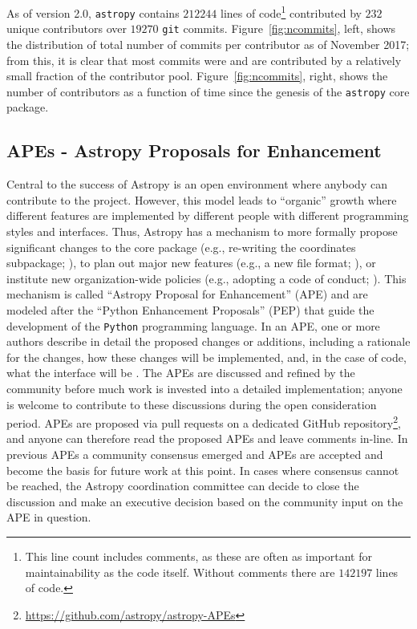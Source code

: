 \documentclass[modern]{aastex61}
\newcommand{\package}[1]{\texttt{#1}\xspace}
\newcommand{\python}{\package{Python}}
\newcommand{\astropy}{Astropy\xspace}
\newcommand{\astropypkg}{\package{astropy}}
\renewcommand{\figurename}{Figure\xspace}
\begin{document}
As of version 2.0, \astropypkg contains $212244$ lines of code\footnote{This
line count includes comments, as these are often as important for
maintainability as the code itself.  Without comments there are $142197$ lines
of code.} contributed by $232$ unique contributors over $19270$ \texttt{git}
commits.
\figurename~\ref{fig:ncommits}, left, shows the distribution of total number of
commits per contributor as of November 2017; from this, it is clear that most
commits were and are contributed by a relatively small fraction of the
contributor pool.
\figurename~\ref{fig:ncommits}, right, shows the number of contributors as a
function of time since the genesis of the \astropypkg core package.

\subsection{APEs - Astropy Proposals for Enhancement}

Central to the success of \astropy is an open environment where anybody can
contribute to the project.
However, this model leads to ``organic'' growth where different features are
implemented by different people with different programming styles and
interfaces.
Thus, \astropy has a mechanism to more formally propose significant changes to
the core package (e.g., re-writing the coordinates subpackage; \citealt{ape5}),
to plan out major new features (e.g., a new file format; \citealt{ape6}), or
institute new organization-wide policies (e.g., adopting a code of conduct;
\citealt{ape8}).
This mechanism is called ``Astropy Proposal for Enhancement'' (APE) and are
modeled after the ``Python Enhancement Proposals'' (PEP) that guide the
development of the \python programming language.
In an APE, one or more authors describe in detail the proposed changes or
additions, including a rationale for the changes, how these changes will be
implemented, and, in the case of code, what the interface will be \citep{ape1}.
The APEs are discussed and refined by the community before much work is invested
into a detailed implementation; anyone is welcome to contribute to these
discussions during the open consideration period. APEs are proposed via pull
requests on a dedicated GitHub repository\footnote{\url{https://github.com/astropy/astropy-APEs}},
and anyone can therefore read the proposed APEs and leave comments in-line.
In previous APEs a community consensus emerged and APEs are accepted and become
the basis for future work at this point.
In cases where consensus cannot be reached, the
\astropy coordination committee can decide to close the discussion and
make an executive decision based on the community input on the APE in question.
\end{document}
